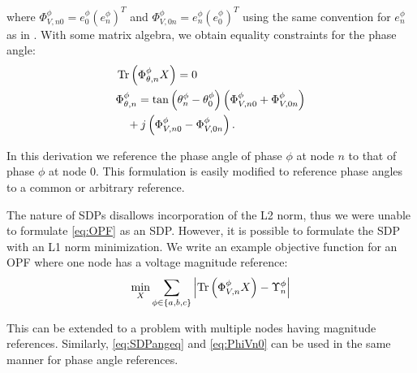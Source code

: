 \noindent where $\Phi_{V,n0}^{\phi} = e_{0}^{\phi} {\left( e_{n}^{\phi} \right)}^{T}$ and $\Phi_{V,0n}^{\phi} = e_{n}^{\phi} {\left( e_{0}^{\phi} \right)}^{T}$ using the same convention for $e_{n}^{\phi}$ as in \cite{dall2012optimization}. With some matrix algebra, we obtain equality constraints for the phase angle:
\begin{align}
     & \operatorname{Tr} \left(\Phi_{\theta,n}^{\phi} X \right) = 0 \label{eq:SDPangeq} \\
     & \Phi_{\theta,n}^{\phi} = \tan \left( \theta_{n}^{\phi} - \theta_{0}^{\phi} \right)
    \left( \Phi_{V,n0}^{\phi} + \Phi_{V,0n}^{\phi} \right)
    \nonumber \\
     & \quad +
    j \left( \Phi_{V,n0}^{\phi} - \Phi_{V,0n}^{\phi} \right).
    \label{eq:PhiVn0}
\end{align}

In this derivation we reference the phase angle of phase $\phi$ at node $n$ to that of phase $\phi$ at node $0$. This formulation is easily modified to reference phase angles to a common or arbitrary reference.

The nature of SDPs disallows incorporation of the L2 norm, thus we were unable to formulate \eqref{eq:OPF} as an SDP. However, it is possible to formulate the SDP with an L1 norm minimization. We write an example objective function for an OPF where one node has a voltage magnitude reference:
\begin{equation}
	\min_{X} \sum_{\phi \in \{ a,b,c \}} \left| \operatorname{Tr} \left( \Phi_{V,n}^{\phi} X \right) - \Upsilon_{n}^{\phi} \right|
\end{equation}

\noindent This can be extended to a problem with multiple nodes having magnitude references. Similarly, \eqref{eq:SDPangeq} and \eqref{eq:PhiVn0} can be used in the same manner for phase angle references.